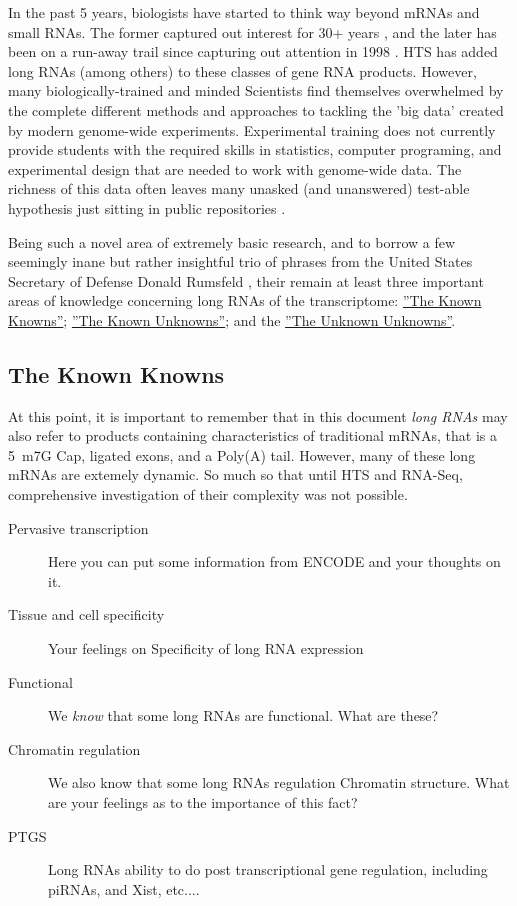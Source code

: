 In the past 5 years, biologists have started to think way beyond mRNAs and small RNAs. The former captured out interest for 30+ years \citep{Furuichi1975,Wei1975}, and the later has been on a run-away trail since capturing out attention in 1998 \citep{Fire1998}. HTS has added long RNAs (among others) to these classes of gene RNA products. However, many biologically-trained and minded Scientists find themselves overwhelmed by the complete different methods and approaches to tackling the 'big data' created by modern genome-wide experiments. Experimental training does not currently provide students with the required skills in statistics, computer programing, and experimental design that are needed to work with genome-wide data. The richness of this data often leaves many unasked (and unanswered) test-able hypothesis just sitting in public repositories \citep{Plocik2013}.

Being such a novel area of extremely basic research, and to borrow a few seemingly inane but rather insightful trio of phrases from the United States Secretary of Defense Donald Rumsfeld \citep{Rumsfeld2011}, their remain at least three important areas of knowledge concerning long RNAs of the transcriptome: 
\hyperref[subsec: The Known Knowns]{''The Known Knowns''}; 
\hyperref[subsec: The Known Unknowns]{''The Known Unknowns''}; 
and the \hyperref[subsec: The Unknown Unknowns]{''The Unknown Unknowns''}.

\subsection{The Known Knowns}\label{subsec: The Known Knowns}

At this point, it is important to remember that in this document \textit{long RNAs} may also refer to products containing characteristics of traditional mRNAs, that is a 5\textprime~m7G Cap, ligated exons, and a Poly(A) tail. However, many of these long mRNAs are extemely dynamic. So much so that until HTS and RNA-Seq, comprehensive investigation of their complexity was not possible.


\begin{description}
	\item[Pervasive transcription]
	Here you can put some information from ENCODE and your thoughts on it.

	\item[Tissue and cell specificity]
	Your feelings on Specificity of long RNA expression

	\item[Functional]
	We \textit{know} that some long RNAs are functional. What are these?

	\item[Chromatin regulation]
	We also know that some long RNAs regulation Chromatin structure. What are your feelings as to the importance of this fact?

	\item[PTGS]
	Long RNAs ability to do post transcriptional gene regulation, including piRNAs, and Xist, etc....

\end{description}


